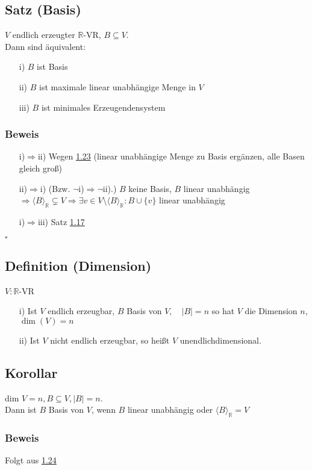 \documentclass[a4paper, 12pt,titlepage, pdf, headsepline]{scrartcl}
\newcommand{\R}{\mathds{R}}
\newcommand{\vecspace}[2]{\langle#1\rangle_{#2}}
\newcommand{\vecspaceR}[1]{\vecspace{#1}{\R}}
\renewcommand{\>}{\rightarrow}
\renewcommand{\*}{\cdot}
\begin{document}
\subsection{Satz (Basis)}
\label{1.24}
$V$ endlich erzeugter $\R$-VR, $B\subseteq V$.\\
Dann sind äquivalent:
\begin{itemize}
	\item[i)] $B$ ist Basis
	\item[ii)] $B$ ist maximale linear unabhängige Menge in $V$
	\item[iii)] $B$ ist minimales Erzeugendensystem
\end{itemize}
\subsubsection*{Beweis}
\begin{itemize}
	\item[i)$\Rightarrow$ii)] Wegen \hyperref[1.23]{1.23} (linear unabhängige Menge zu Basis ergänzen, alle Basen gleich groß)
	\item[ii)$\Rightarrow$i)] (Bzw. $\neg$i)$\Rightarrow\neg$ii).) $B$ keine Basis, $B$ linear unabhängig\\
	      $\Rightarrow\langle B\rangle_\R\subsetneq V\Rightarrow\exists v\in V\setminus\langle B\rangle_\R\colon B\cup\{v\}$ linear unabhängig
	\item[i)$\Rightarrow$iii)] Satz \hyperref[1.17]{1.17} 
\end{itemize}\hfill$\square$
\subsection{Definition (Dimension)}
$V: \R $-VR\\
\begin{itemize}
	\item[i)] Ist $V$ endlich erzeugbar, $B$ Basis von $V,\quad|B| = n$ so hat $V$ die Dimension $n$, $\dim(V) = n$
	\item[ii)] Ist $V$ nicht endlich erzeugbar, so heißt $V$ unendlichdimensional. 
\end{itemize}
\subsection{Korollar}
\label{1.26}
dim $V = n, B \subseteq V, |B| = n$.\\
Dann ist $B$ Basis von $V$, wenn $B$ linear unabhängig oder $\vecspaceR{B} = V$
\subsubsection*{Beweis} Folgt aus \hyperref[1.24]{1.24}
\end{document}
